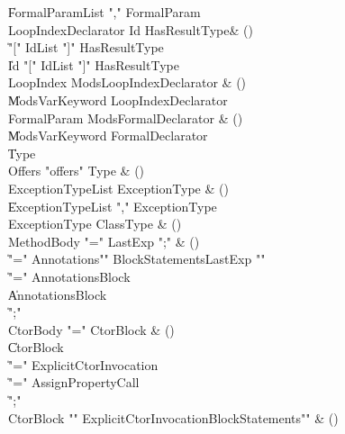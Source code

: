 \begin{bbgrammar}

    \| FormalParamList \xcd"," FormalParam\\
 LoopIndexDeclarator  \label{prod:LoopIndexDeclarator}  \: Id HasResultType\opt & ()\\
    \| \xcd"[" IdList \xcd"]" HasResultType\opt\\
    \| Id \xcd"[" IdList \xcd"]" HasResultType\opt\\
 LoopIndex  \label{prod:LoopIndex}  \: Mods\opt LoopIndexDeclarator & ()\\
    \| Mods\opt VarKeyword LoopIndexDeclarator\\
 FormalParam  \label{prod:FormalParam}  \: Mods\opt FormalDeclarator & ()\\
    \| Mods\opt VarKeyword FormalDeclarator\\
    \| Type\\
 Offers  \label{prod:Offers}  \: \xcd"offers" Type & ()\\
 ExceptionTypeList  \label{prod:ExceptionTypeList}  \: ExceptionType & ()\\
    \| ExceptionTypeList \xcd"," ExceptionType\\
 ExceptionType  \label{prod:ExceptionType}  \: ClassType & ()\\
 MethodBody  \label{prod:MethodBody}  \: \xcd"=" LastExp \xcd";" & ()\\
    \| \xcd"=" Annotations\opt \xcd"{" BlockStatements\opt LastExp \xcd"}"\\
    \| \xcd"=" Annotations\opt Block\\
    \| Annotations\opt Block\\
    \| \xcd";"\\
 CtorBody  \label{prod:CtorBody}  \: \xcd"=" CtorBlock & ()\\
    \| CtorBlock\\
    \| \xcd"=" ExplicitCtorInvocation\\
    \| \xcd"=" AssignPropertyCall\\
    \| \xcd";"\\
 CtorBlock  \label{prod:CtorBlock}  \: \xcd"{" ExplicitCtorInvocation\opt BlockStatements\opt \xcd"}" & ()\\

\end{bbgrammar}
